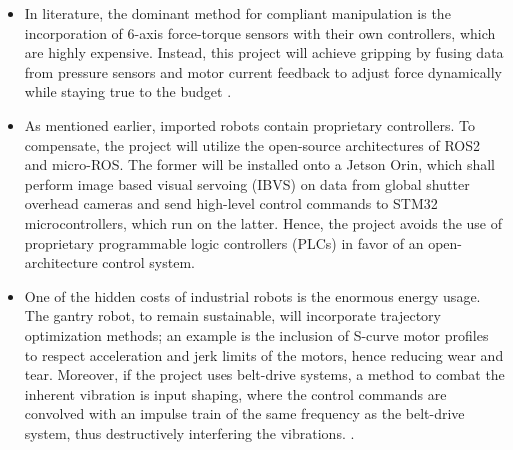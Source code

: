 \begin{itemize}
    \item In literature, the dominant method for compliant manipulation is the incorporation of 6-axis force-torque sensors with their own controllers, which are highly expensive. Instead, this project will achieve gripping by fusing data from pressure sensors and motor current feedback to adjust force dynamically while staying true to the budget \cite{arxiv2025guarding, liu2021sensorless}. 
    
    \item As mentioned earlier, imported robots contain proprietary controllers. To compensate, the project will utilize the open-source architectures of ROS2 and micro-ROS. The former will be installed onto a Jetson Orin, which shall perform image based visual servoing (IBVS) on data from global shutter overhead cameras and send high-level control commands to STM32 microcontrollers, which run on the latter. \cite{weigand2020flatness} Hence, the project avoids the use of proprietary programmable logic controllers (PLCs) in favor of an open-architecture control system. 
    
    \item One of the hidden costs of industrial robots is the enormous energy usage. The gantry robot, to remain sustainable, will incorporate trajectory optimization methods; an example is the inclusion of S-curve motor profiles to respect acceleration and jerk limits of the motors, hence reducing wear and tear. Moreover, if the project uses belt-drive systems, a method to combat the inherent vibration is input shaping, where the control commands are convolved with an impulse train of the same frequency as the belt-drive system, thus destructively interfering the vibrations. \cite{mahdavian2015optimal, soori2023optimization}. 
    
\end{itemize}